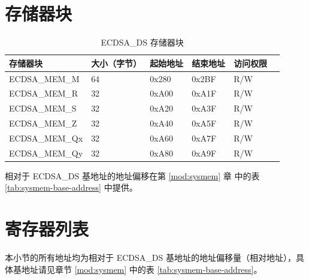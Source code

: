 \documentclass[main\_\_CN.tex]{subfiles}
\begin{document}
\newpage
\section{存储器块}

\begin{table}[H]
    \centering
    \caption{ECDSA\_DS 存储器块} \label{tab:ecdsa-memory}
    \begin{threeparttable}
    \begin{tabular}{ | l | l | l | l | l | l | }
    \hline
        \rowcolor{lightgray}
        \textbf{存储器块} & \textbf{大小（字节）}  &  \textbf{起始地址}\tnote{*} &  \textbf{结束地址} \tnote{*} & \textbf{访问权限}   \\ \hline
        ECDSA\_MEM\_M    & 64  & 0x280 & 0x2BF & R/W \\ \hline
        ECDSA\_MEM\_R    & 32  & 0xA00 & 0xA1F & R/W \\ \hline
        ECDSA\_MEM\_S    & 32  & 0xA20 & 0xA3F & R/W \\ \hline
        ECDSA\_MEM\_Z    & 32  & 0xA40 & 0xA5F & R/W \\ \hline
        ECDSA\_MEM\_Qx   & 32  & 0xA60 & 0xA7F & R/W \\ \hline
        ECDSA\_MEM\_Qy   & 32  & 0xA80 & 0xA9F & R/W \\ \hline
    \end{tabular}
    \begin{tablenotes}
        \item[*] 相对于 ECDSA\_DS 基地址的地址偏移在第 \ref{mod:sysmem} 章\textit{} 中的表 \ref{tab:sysmem-base-address} 中提供。
    \end{tablenotes}
    \end{threeparttable}
\end{table}





\newpage
\hypertarget{ecdsa-reg-summ}{}
\section{寄存器列表}
\label{sec:ecdsa-reg-summ}

本小节的所有地址均为相对于 ECDSA\_DS 基地址的地址偏移量（相对地址），具体基地址请见章节 \ref{mod:sysmem} \textit{} 中的表 \ref{tab:sysmem-base-address}。
\end{document}

